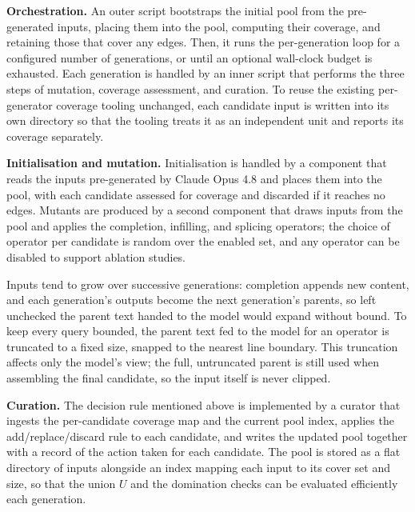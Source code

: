 \lilspace
\textbf{Orchestration.} An outer script bootstraps the initial pool from the pre-generated inputs, placing them into the pool, computing their coverage, and retaining those that cover any edges. Then, it runs the per-generation loop for a configured number of generations, or until an optional wall-clock budget is exhausted. Each generation is handled by an inner script that performs the three steps of mutation, coverage assessment, and curation. To reuse the existing per-generator coverage tooling unchanged, each candidate input is written into its own directory so that the tooling treats it as an independent unit and reports its coverage separately.

\lilspace
\textbf{Initialisation and mutation.} Initialisation is handled by a component that reads the inputs pre-generated by Claude Opus 4.8 and places them into the pool, with each candidate assessed for coverage and discarded if it reaches no edges. Mutants are produced by a second component that draws inputs from the pool and applies the completion, infilling, and splicing operators; the choice of operator per candidate is random over the enabled set, and any operator can be disabled to support ablation studies. 

Inputs tend to grow over successive generations: completion appends new content, and each generation's outputs become the next generation's parents, so left unchecked the parent text handed to the model would expand without bound. To keep every query bounded, the parent text fed to the model for an operator is truncated to a fixed size, snapped to the nearest line boundary. This truncation affects only the model's view; the full, untruncated parent is still used when assembling the final candidate, so the input itself is never clipped.

\lilspace
\textbf{Curation.} The decision rule mentioned above is implemented by a curator that ingests the per-candidate coverage map and the current pool index, applies the add/replace/discard rule to each candidate, and writes the updated pool together with a record of the action taken for each candidate. The pool is stored as a flat directory of inputs alongside an index mapping each input to its cover set and size, so that the union $U$ and the domination checks can be evaluated efficiently each generation.
